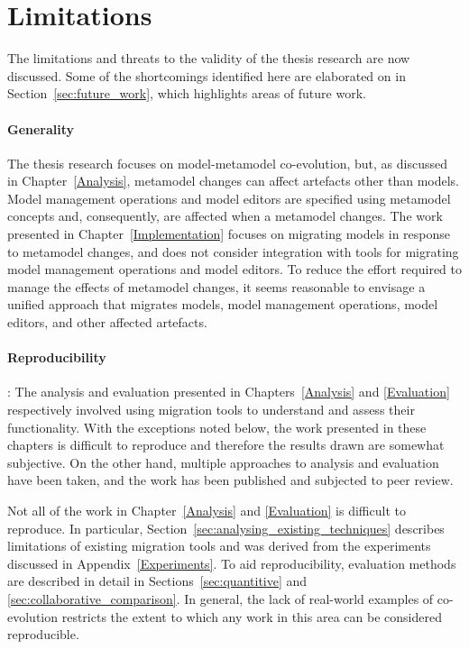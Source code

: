 
\section{Limitations}
The limitations and threats to the validity of the thesis research are now discussed. Some of the shortcomings identified here are elaborated on in Section~\ref{sec:future_work}, which highlights areas of future work.

\paragraph{Generality} The thesis research focuses on model-metamodel co-evolution, but, as discussed in Chapter~\ref{Analysis}, metamodel changes can affect artefacts other than models. Model management operations and model editors are specified using metamodel concepts and, consequently, are affected when a metamodel changes. The work presented in Chapter~\ref{Implementation} focuses on migrating models in response to metamodel changes, and does not consider integration with tools for migrating model management operations and model editors. To reduce the effort required to manage the effects of metamodel changes, it seems reasonable to envisage a unified approach that migrates models, model management operations, model editors, and other affected artefacts.

\paragraph{Reproducibility}: The analysis and evaluation presented in Chapters~\ref{Analysis} and \ref{Evaluation} respectively involved using migration tools to understand and assess their functionality. With the exceptions noted below, the work presented in these chapters is difficult to reproduce and therefore the results drawn are somewhat subjective. On the other hand, multiple approaches to analysis and evaluation have been taken, and the work has been published and subjected to peer review. 

Not all of the work in Chapter~\ref{Analysis} and \ref{Evaluation} is difficult to reproduce. In particular, Section~\ref{sec:analysing_existing_techniques} describes limitations of existing migration tools and was derived from the experiments discussed in Appendix~\ref{Experiments}. To aid reproducibility, evaluation methods are described in detail in Sections~\ref{sec:quantitive} and \ref{sec:collaborative_comparison}. In general, the lack of real-world examples of co-evolution restricts the extent to which any work in this area can be considered reproducible. 

